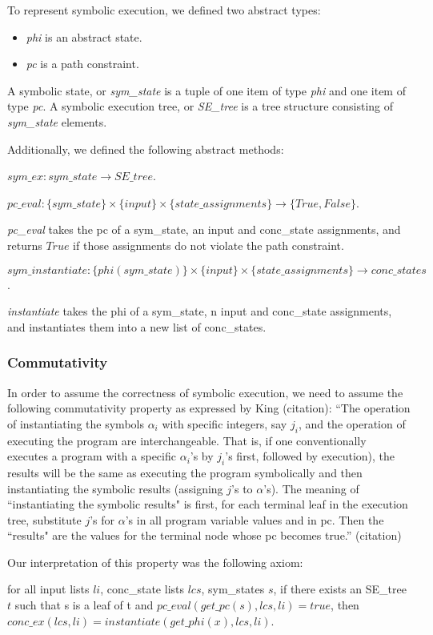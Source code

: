 To represent symbolic execution, we defined two abstract types:
\begin{itemize}
\item \emph{phi} is an abstract state.
\item \emph{pc} is a path constraint.
\end{itemize}

A symbolic state, or \emph{sym\_state} is a tuple of one item of type \emph{phi} and one item of type \emph{pc}.
A symbolic execution tree, or \emph{SE\_tree} is a tree structure consisting of \emph{sym\_state} elements. 


Additionally, we defined the following abstract methods:
\begin{define} 
$sym\_ex: sym\_state \rightarrow SE\_tree $.
\end{define}

\begin{define} [PC Evaluation]
$pc\_eval: \{sym\_state\} \times \{input\} \times \{state\_assignments\} \rightarrow \{True, False\} $.
\end{define}
\emph{pc\_eval} takes the pc of a sym\_state, an input and conc\_state assignments, and returns $True$ if those assignments do not violate the path constraint.

\begin{define} 
$sym\_instantiate: \{phi(sym\_state)\} \times \{input\} \times \{state\_assignments\} \rightarrow conc\_states $.
\end{define}
 \emph{instantiate} takes the phi of a sym\_state, n input and conc\_state assignments, and instantiates them into a new list of conc\_states.
 



\subsubsection{Commutativity}
In order to assume the correctness of symbolic execution, we need to assume the following commutativity property as expressed by King (citation):
``The operation of instantiating the symbols
{$\alpha_i$} with specific integers, say {$j_i$}, and the operation of
executing the program are interchangeable. That is, if
one conventionally executes a program with a specific
$\alpha_i$'s by
$j_i$'s first, followed by execution), the results will be the
same as executing the program symbolically and then
instantiating the symbolic results (assigning $j$'s to $\alpha$'s).
The meaning of ``instantiating the symbolic results" is
first, for each terminal leaf in the execution tree, substitute
$j$'s for $\alpha$'s in all program variable values and in
pc. Then the ``results" are the values for the terminal 
node whose pc becomes true.'' (citation)


Our interpretation of this property was the following axiom:
\begin{axiom}
for all input lists $li$, conc\_state lists $lcs$, sym\_states $s$,
if there exists an SE\_tree $t$ such that
s is a leaf of t and
$pc\_eval (get\_pc(s), lcs, li) = true$,
then
$conc\_ex(lcs, li) = instantiate (get\_phi (x), lcs, li)$.
\end{axiom}

